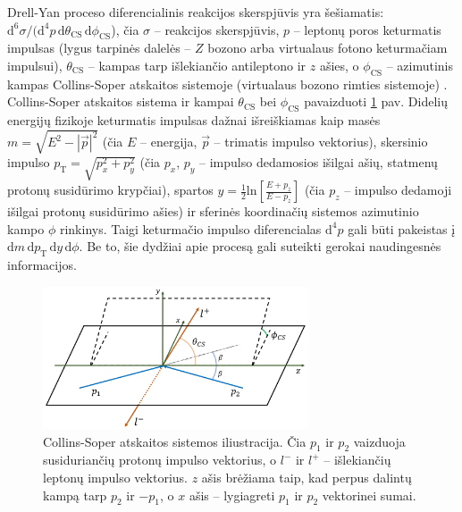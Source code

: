 \documentclass[a4paper, 12pt, oneside]{article}
\newcommand{\pT}{p_{\mathrm{T}}}
\newlength\q
\begin{document}
Drell-Yan proceso diferencialinis reakcijos skerspjūvis yra šešiamatis:
$\mathrm{d}^6\sigma/(\mathrm{d}^4p\,\mathrm{d}\theta_{\mathrm{CS}}\,\mathrm{d}\phi_\mathrm{CS}$), čia $\sigma$ -- reakcijos skerspjūvis,
$p$ -- leptonų poros keturmatis impulsas (lygus tarpinės dalelės -- $Z$ bozono arba virtualaus fotono keturmačiam
impulsui), $\theta_{\mathrm{CS}}$ -- kampas tarp išlekiančio antileptono ir $z$ ašies, o $\phi_{\mathrm{CS}}$ -- azimutinis kampas
Collins-Soper atskaitos sistemoje (virtualaus bozono rimties sistemoje) \cite{DYangular}.
Collins-Soper atskaitos sistema ir kampai $\theta_{\mathrm{CS}}$ bei $\phi_{\mathrm{CS}}$ pavaizduoti \ref{fig:CSframe} pav.
Didelių energijų fizikoje keturmatis impulsas dažnai išreiškiamas kaip masės $m=\sqrt{E^2-|\vec{p}|^2}$ (čia $E$ -- energija,
$\vec{p}$ -- trimatis impulso vektorius), skersinio impulso $\pT=\sqrt{p_x^2+p_y^2}$ (čia $p_x$, $p_y$ -- impulso dedamosios
išilgai ašių, statmenų protonų susidūrimo krypčiai), spartos $y=\frac{1}{2}\mathrm{ln}[\frac{E+p_z}{E-p_z}]$ (čia $p_z$ -- impulso dedamoji
išilgai protonų susidūrimo ašies) ir sferinės koordinačių sistemos azimutinio kampo $\phi$ rinkinys.
Taigi keturmačio impulso diferencialas $\mathrm{d}^4p$ gali būti pakeistas į $\mathrm{d}m\,\mathrm{d}\pT\,\mathrm{d}y\,\mathrm{d}\phi$.
Be to, šie dydžiai apie procesą gali suteikti gerokai naudingesnės informacijos.

\begin{figure}[b!]
	\includegraphics[width=0.7\textwidth]{Magistrinis/CSframe.png}
	\caption{\label{fig:CSframe} Collins-Soper atskaitos sistemos iliustracija.
	Čia $p_1$ ir $p_2$ vaizduoja susiduriančių protonų impulso vektorius, o $l^-$ ir $l^+$ -- išlekiančių leptonų impulso vektorius.
	$z$ ašis brėžiama taip, kad perpus dalintų kampą tarp $p_2$ ir $-p_1$, o $x$ ašis -- lygiagreti $p_1$ ir $p_2$ vektorinei sumai.}
\end{figure}
\end{document}
